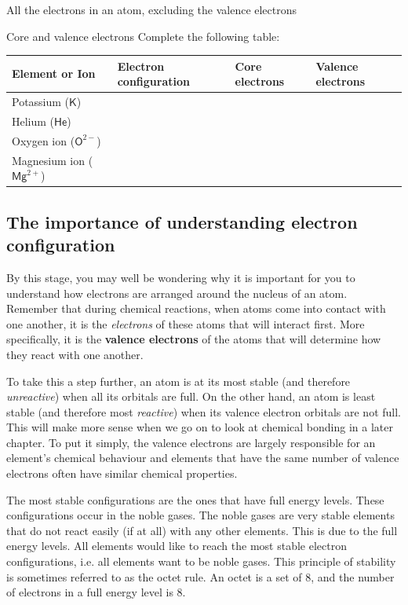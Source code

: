  { \label{m38741*meaningfhsst!!!underscore!!!id758}
        \label{m38741*id259989}All the electrons in an atom, excluding the valence electrons} 
\begin{exercises}{Core and valence electrons}
Complete the following table:
 \begin{center}
  \begin{tabular}{|l|l|l|l|} \hline
   \textbf{Element or Ion} & \textbf{Electron configuration} & \textbf{Core electrons} & \textbf{Valence electrons} \\ \hline
   Potassium ($\mathsf{K}$) & & & \\ \hline
   Helium ($\mathsf{He}$) & & & \\ \hline
   Oxygen ion ($\mathsf{O}^{2-}$) & & & \\ \hline
   Magnesium ion ($\mathsf{Mg}^{2+}$) & & & \\ \hline
  \end{tabular}
 \end{center}

\end{exercises}
      
\label{m38741*uid105}
            \subsection*{The importance of understanding electron configuration}
            \nopagebreak
        \label{m38741*id260011}By this stage, you may well be wondering why it is important for you to understand how electrons are arranged around the nucleus of an atom. Remember that during chemical reactions, when atoms come into contact with one another, it is the \textsl{electrons} of these atoms that will interact first. More specifically, it is the \textbf{valence electrons} of the atoms that will determine how they react with one another.\par 
        \label{m38741*id260029}To take this a step further, an atom is at its most stable (and therefore \textsl{unreactive}) when all its orbitals are full. On the other hand, an atom is least stable (and therefore most \textsl{reactive}) when its valence electron orbitals are not full. This will make more sense when we go on to look at chemical bonding in a later chapter. To put it simply, the valence electrons are largely responsible for an element's chemical behaviour and elements that have the same number of valence electrons often have similar chemical properties.\par 
\label{m38741*eip-106}The most stable configurations are the ones that have full energy levels. These configurations occur in the noble gases. The noble gases are very stable elements that do not react easily (if at all) with any other elements. This is due to the full energy levels. All elements would like to reach the most stable electron configurations, i.e. all elements want to be noble gases. This principle of stability is sometimes referred to as the octet rule. An octet is a set of 8, and the number of electrons in a full energy level is 8. \par \label{m38741*eip-739}

